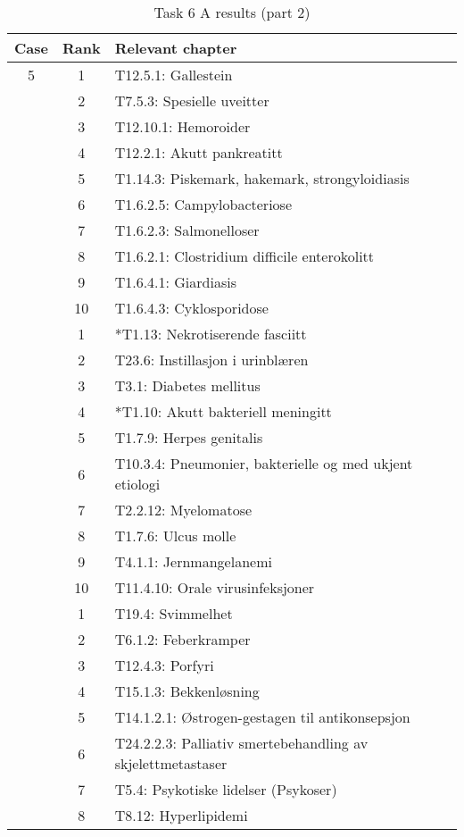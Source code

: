 \begin{table}[htbp] \footnotesize \center
\caption{Task 6 A results (part 2)\label{tab:task6a2}}
\begin{tabular}{c c l}
    \toprule
    Case & Rank & Relevant chapter \\
    \midrule
	5 & 1 & T12.5.1: Gallestein \\
	 & 2 & T7.5.3: Spesielle uveitter \\
	 & 3 & T12.10.1: Hemoroider \\
	 & 4 & T12.2.1: Akutt pankreatitt \\
	 & 5 & T1.14.3: Piskemark, hakemark, strongyloidiasis \\
	 & 6 & T1.6.2.5: Campylobacteriose \\
	 & 7 & T1.6.2.3: Salmonelloser \\
	 & 8 & T1.6.2.1: Clostridium difficile enterokolitt \\
	 & 9 & T1.6.4.1: Giardiasis \\
	 & 10 & T1.6.4.3: Cyklosporidose \\
	\addlinespace
	6 & 1 & *T1.13: Nekrotiserende fasciitt \\
	 & 2 & T23.6: Instillasjon i urinblæren \\
	 & 3 & T3.1: Diabetes mellitus \\
	 & 4 & *T1.10: Akutt bakteriell meningitt \\
	 & 5 & T1.7.9: Herpes genitalis \\
	 & 6 & T10.3.4: Pneumonier, bakterielle og med ukjent etiologi \\
	 & 7 & T2.2.12: Myelomatose \\
	 & 8 & T1.7.6: Ulcus molle \\
	 & 9 & T4.1.1: Jernmangelanemi \\
	 & 10 & T11.4.10: Orale virusinfeksjoner \\
	\addlinespace
	7 & 1 & T19.4: Svimmelhet \\
	 & 2 & T6.1.2: Feberkramper \\
	 & 3 & T12.4.3: Porfyri \\
	 & 4 & T15.1.3: Bekkenløsning \\
	 & 5 & T14.1.2.1: Østrogen-gestagen til antikonsepsjon \\
	 & 6 & T24.2.2.3: Palliativ smertebehandling av skjelettmetastaser \\
	 & 7 & T5.4: Psykotiske lidelser (Psykoser) \\
	 & 8 & T8.12: Hyperlipidemi \\

\end{tabular}
\end{table}
